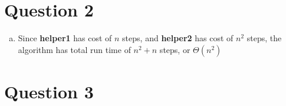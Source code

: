 \documentclass[12pt]{article}
\begin{document}
\section*{Question 2}
\begin{enumerate}[a.]
    \item

    Since \textbf{helper1} has cost of $n$ steps, and \textbf{helper2} has cost of
    $n^2$ steps, the algorithm has total run time of $n^2 + n$ steps, or $\Theta (n^2)$
\end{enumerate}

\section*{Question 3}
\end{document}
